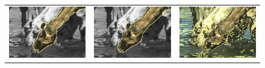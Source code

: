 \documentclass[smallextended]{svjour3}       %
\begin{document}
{{\begin{figure}[hp!]
\begin{tabular}{ccc}
		\includegraphics[scale=0.2]{images/segmentation/bc/camel/gc-seg.png} &
		\includegraphics[scale=0.2]{images/segmentation/bc/camel/corrected-seg.png} &
		\includegraphics[scale=0.2]{images/segmentation/schoenemann/camel/camel-seg.png}\\		

\end{tabular}
\end{figure}}}
\end{document}
